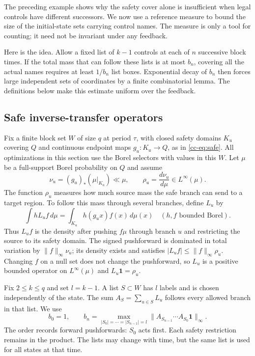 \documentclass[11pt,reqno]{amsart}
\numberwithin{equation}{section}
\theoremstyle{definition}
\theoremstyle{definition}
\newcommand{\one}{\mathbf 1}
\begin{document}
The preceding example shows why the safety cover alone is insufficient
when legal controls have different successors. We now use a reference
measure to bound the size of the initial-state sets carrying control
names. The measure is only a tool for counting; it need not be
invariant under any feedback.

Here is the idea. Allow a fixed list of $k-1$ controls at each of $n$
successive block times. If the total mass that can follow these lists
is at most $b_n$, covering all the actual names requires at least
$1/b_n$ list boxes. Exponential decay of $b_n$ then forces large
independent sets of coordinates by a finite combinatorial lemma.
The definitions below make this estimate uniform over the feedback.

\subsection{Safe inverse-transfer operators}
Fix a finite block set $W$ of size $q$ at period $\tau$, with
closed safety domains $K_u$ covering $Q$ and continuous endpoint
maps $g_u:K_u\to Q$, as in \eqref{cc-eq:safe}. All optimizations
in this section use the Borel selectors with values in this $W$.
Let $\mu$ be a full-support Borel probability on $Q$ and assume
\begin{equation}\label{eq:cap-density}
 \nu_u=(g_u)_*(\mu|_{K_u})\ll\mu,\qquad
 \rho_u=\frac{d\nu_u}{d\mu}\in L^\infty(\mu).
\end{equation}
The function $\rho_u$ measures how much source mass the safe branch
can send to a target region. To follow this mass through several
branches, define $L_u$ by
\begin{equation}\label{eq:cap-transfer}
 \int hL_uf\,d\mu=\int_{K_u}h(g_ux)f(x)\,d\mu(x)
 \quad(h,f\text{ bounded Borel}).
\end{equation}
Thus $L_uf$ is the density after pushing $f\mu$ through branch $u$
and restricting the source to its safety domain. The signed
pushforward is dominated in total variation by $\|f\|_\infty\nu_u$;
its density exists and satisfies
$|L_uf|\le\|f\|_\infty\rho_u$. Changing $f$ on a null set
does not change the pushforward, so $L_u$ is a positive bounded
operator on $L^\infty(\mu)$ and $L_u\one=\rho_u$.

Fix $2\le k\le q$ and set $l=k-1$. A list $S\subset W$ has
$l$ labels and is chosen independently of the state. The sum
$A_S=\sum_{u\in S}L_u$ follows every allowed branch in that
list. We use
\begin{equation}\label{eq:cap-bn}
 b_0=1,\qquad
 b_n=\max_{|S_0|=\cdots=|S_{n-1}|=l}
       \|A_{S_{n-1}}\cdots A_{S_0}\one\|_\infty.
\end{equation}
The order records forward pushforwards: $S_0$ acts first. Each safety
restriction remains in the product. The lists may change with time,
but the same list is used for all states at that time.
\end{document}
